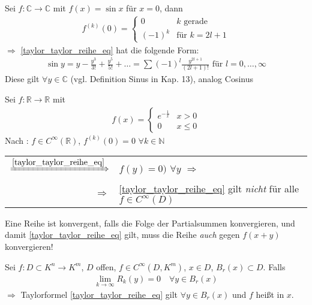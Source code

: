\begin{example}
	Sei $f:\mathbb{C}\to\mathbb{C}$ mit $f(x) = \sin x$ für $x = 0$, dann \begin{align*}
		f^{(k)}(0) = \begin{cases}
			0& \text{$k$ gerade} \\
			(-1)^k & \text{für $k=2l + 1$}
		\end{cases}
	\end{align*}
	$\Rightarrow$ \eqref{taylor_taylor_reihe_eq} hat die folgende Form:\begin{align*}
		\sin y = y - \frac{y^3}{3!} + \frac{y^5}{5!} + \dotsc = \sum(-1)^l \frac{y^{2l+1}}{(2l+1)!} \text{ für }l = 0,\dotsc,\infty
	\end{align*}
	Diese gilt $\forall y\in\mathbb{C}$ (vgl. Definition Sinus in Kap. 13), analog Cosinus
\end{example}

\begin{example}
	Sei $f:\mathbb{R}\to\mathbb{R}$ mit \begin{align*}
		f(x) = \begin{cases}
			e^{-\frac{1}{x}} & x> 0 \\
			0 & x\le 0
		\end{cases}
	\end{align*}
	Nach : $f\in C^\infty(\mathbb{R})$, $f^{(k)}(0) = 0$ $\forall k\in \mathbb{N}$\\
	\begin{tabularx}{\linewidth}{r@{\ \ }X}
	$\xRightarrow{\eqref{taylor_taylor_reihe_eq}}$ & $f(y) = 0)$ $\forall y$ $\Rightarrow$ \Lightning \\
	$\Rightarrow$ & \eqref{taylor_taylor_reihe_eq} gilt \emph{nicht} für alle $f\in C^\infty(D)$
	\end{tabularx}
\end{example}

\begin{underlinedenvironment}[Wiederholung]
	Eine Reihe ist konvergent, falls die Folge der Partialsummen konvergieren, und damit \eqref{taylor_taylor_reihe_eq} gilt, muss die Reihe \emph{auch} gegen $f(x+y)$ konvergieren!
\end{underlinedenvironment}

\begin{proposition}[Taylorreihe]
	Sei $f:D\subset K^n\to K^m$, $D$ offen, $f\in C^\infty(D, K^m)$, $x\in D$, $B_r(x)\subset D$. Falls \begin{align*}
		\lim\limits_{k\to\infty} R_k(y) = 0\quad\forall y\in B_r(x)
	\end{align*}
	$\Rightarrow$ Taylorformel \eqref{taylor_taylor_reihe_eq} gilt $\forall y\in B_r(x)$ und $f$ heißt  in $x$.
\end{proposition}

